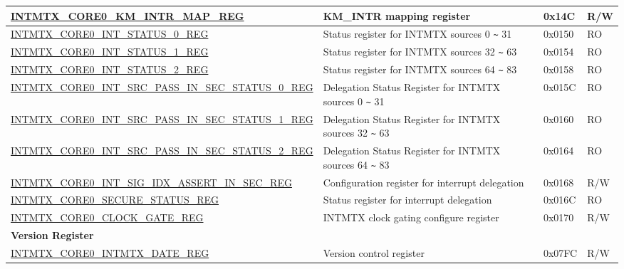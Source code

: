 \begin{longtable}{ | p{10cm} | p{10cm} | p{1.3cm} | p{1cm} | }
\hyperref[regdesc:INTMTXCORE0KMINTRMAPREG]{INTMTX\_CORE0\_KM\_INTR\_MAP\_REG} & KM\_INTR mapping register & 0x14C & R/W  \\ \hline
\hyperref[regdesc:INTMTXCORE0INTSTATUS0REG]{INTMTX\_CORE0\_INT\_STATUS\_0\_REG} & Status register for INTMTX sources 0 \verb+~+ 31 & 0x0150 & RO \\ \hline
\hyperref[regdesc:INTMTXCORE0INTSTATUS1REG]{INTMTX\_CORE0\_INT\_STATUS\_1\_REG} & Status register for INTMTX sources 32 \verb+~+ 63  & 0x0154 & RO \\ \hline
\hyperref[regdesc:INTMTXCORE0INTSTATUS2REG]{INTMTX\_CORE0\_INT\_STATUS\_2\_REG} & Status register for INTMTX sources 64 \verb+~+ 83 & 0x0158 & RO \\ \hline
\hyperref[regdesc:INTMTXCORE0SRCPASSINSECSTATUS0REG]{INTMTX\_CORE0\_INT\_SRC\_PASS\_IN\_SEC\_STATUS\_0\_REG} & Delegation Status Register for INTMTX sources 0 \verb+~+ 31 & 0x015C & RO \\ \hline
\hyperref[regdesc:INTMTXCORE0SRCPASSINSECSTATUS1REG]{INTMTX\_CORE0\_INT\_SRC\_PASS\_IN\_SEC\_STATUS\_1\_REG} & Delegation Status Register for INTMTX sources 32 \verb+~+ 63  & 0x0160 & RO \\ \hline
\hyperref[regdesc:INTMTXCORE0SRCPASSINSECSTATUS2REG]{INTMTX\_CORE0\_INT\_SRC\_PASS\_IN\_SEC\_STATUS\_2\_REG} & Delegation Status Register for INTMTX sources 64 \verb+~+ 83  & 0x0164 & RO \\ \hline
\hyperref[regdesc:INTMTXCORE0INTSIGIDXASSERTINSECREG]{INTMTX\_CORE0\_INT\_SIG\_IDX\_ASSERT\_IN\_SEC\_REG} & Configuration register for interrupt delegation  & 0x0168 & R/W \\ \hline
\hyperref[regdesc:INTMTXCORE0SECURESTATUSREG]{INTMTX\_CORE0\_SECURE\_STATUS\_REG} & Status register for interrupt delegation & 0x016C & RO \\ \hline
\hyperref[regdesc:INTMTXCORE0CLOCKGATEREG]{INTMTX\_CORE0\_CLOCK\_GATE\_REG} & INTMTX clock gating configure register & 0x0170 & R/W \\ \hline
\multicolumn{4}{|l|}{\textbf{Version Register}} \\ \hline
\hyperref[regdesc:INTMTXCORE0INTMTXDATEREG]{INTMTX\_CORE0\_INTMTX\_DATE\_REG} & Version control register & 0x07FC & R/W \\ \hline
\end{longtable}

